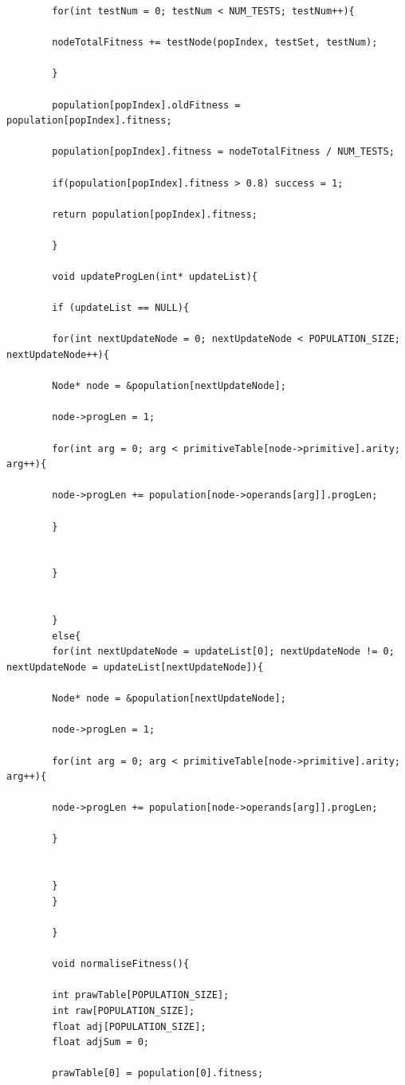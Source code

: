 \documentclass{article}
\begin{document}
\begin{lstlisting}
	    for(int testNum = 0; testNum < NUM_TESTS; testNum++){
	    
	    nodeTotalFitness += testNode(popIndex, testSet, testNum);
	    
	    }
	    
	    population[popIndex].oldFitness = population[popIndex].fitness;
	    
	    population[popIndex].fitness = nodeTotalFitness / NUM_TESTS;
	    
	    if(population[popIndex].fitness > 0.8) success = 1;
	    
	    return population[popIndex].fitness;
	    
	    }
	    
	    void updateProgLen(int* updateList){
	    
	    if (updateList == NULL){
	    
	    for(int nextUpdateNode = 0; nextUpdateNode < POPULATION_SIZE; nextUpdateNode++){
	    
	    Node* node = &population[nextUpdateNode];
	    
	    node->progLen = 1;
	    
	    for(int arg = 0; arg < primitiveTable[node->primitive].arity; arg++){
	    
	    node->progLen += population[node->operands[arg]].progLen;
	    
	    }
	    
	    
	    }
	    
	    
	    }
	    else{
	    for(int nextUpdateNode = updateList[0]; nextUpdateNode != 0; nextUpdateNode = updateList[nextUpdateNode]){
	    
	    Node* node = &population[nextUpdateNode];
	    
	    node->progLen = 1;
	    
	    for(int arg = 0; arg < primitiveTable[node->primitive].arity; arg++){
	    
	    node->progLen += population[node->operands[arg]].progLen;
	    
	    }
	    
	    
	    }
	    }
	    
	    }
	    
	    void normaliseFitness(){
	    
	    int prawTable[POPULATION_SIZE];
	    int raw[POPULATION_SIZE];
	    float adj[POPULATION_SIZE];
	    float adjSum = 0;
	    
	    prawTable[0] = population[0].fitness;
	    

\end{lstlisting}
\end{document}
